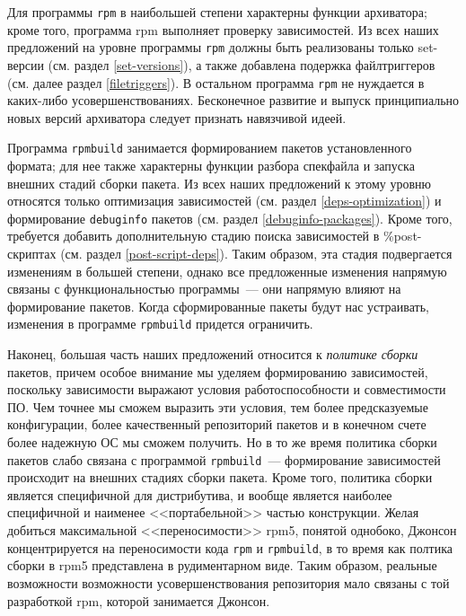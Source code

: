 \documentclass[russian,a4paper,12pt,titlepage]{article}
\begin{document}
Для программы \verb|rpm| в наибольшей степени характерны функции архиватора; кроме того, программа rpm выполняет проверку
зависимостей.  Из всех наших предложений на уровне программы \verb|rpm| должны быть реализованы только set-версии
(см. раздел \ref{set-versions}), а также добавлена подержка файлтриггеров (см. далее раздел \ref{filetriggers}).
В остальном программа \verb|rpm| не нуждается в каких-либо усовершенствованиях.  Бесконечное развитие и выпуск
принципиально новых версий архиватора следует признать навязчивой идеей.

Программа \verb|rpmbuild| занимается формированием пакетов установленного формата; для нее также характерны
функции разбора спекфайла и запуска внешних стадий сборки пакета.  Из всех наших предложений к этому уровню
относятся только оптимизация зависимостей (см. раздел \ref{deps-optimization}) и формирование \verb|debuginfo| пакетов
(см. раздел \ref{debuginfo-packages}).  Кроме того, требуется добавить дополнительную стадию поиска зависимостей в
\%post-скриптах (см. раздел \ref{post-script-deps}).  Таким образом, эта стадия подвергается изменениям в большей
степени, однако все предложенные изменения напрямую связаны с функциональностью программы~--- они напрямую влияют
на формирование пакетов.  Когда сформированные пакеты будут нас устраивать, изменения в программе \verb|rpmbuild|
придется ограничить.

Наконец, большая часть наших предложений относится к \emph{политике сборки} пакетов, причем особое внимание
мы уделяем формированию зависимостей, поскольку зависимости выражают условия работоспособности и совместимости ПО.
Чем точнее мы сможем выразить эти условия, тем более предсказуемые конфигурации, более качественный репозиторий пакетов
и в конечном счете более надежную ОС мы сможем получить.  Но в то же время политика сборки пакетов слабо связана
с программой \verb|rpmbuild|~--- формирование зависимостей происходит на внешних стадиях сборки пакета.  Кроме того,
политика сборки является специфичной для дистрибутива, и вообще является наиболее специфичной и наименее <<портабельной>>
частью конструкции.  Желая добиться максимальной <<переносимости>> rpm5, понятой однобоко, Джонсон концентрируется
на переносимости кода \verb|rpm| и \verb|rpmbuild|, в то время как полтика сборки в rpm5 представлена в рудиментарном виде.
Таким образом, реальные возможности возможности усовершенствования репозитория мало связаны с той разработкой rpm,
которой занимается Джонсон.
\end{document}
